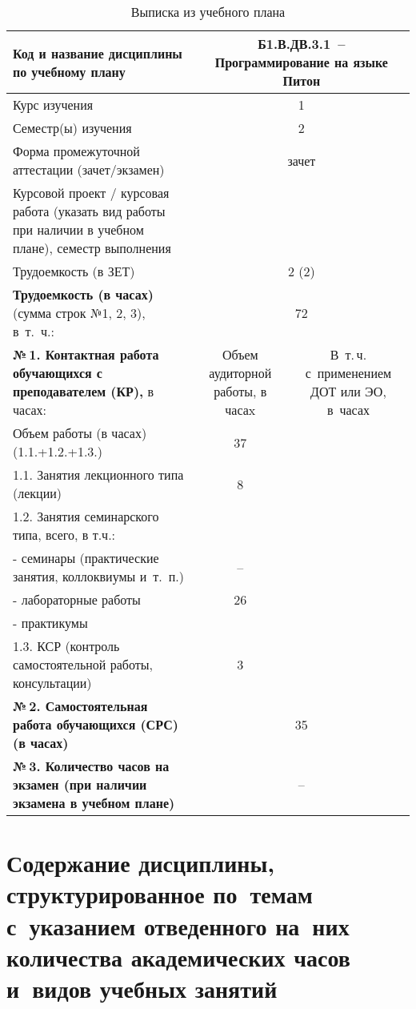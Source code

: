 \documentclass[a4paper,12pt]{article}
\begin{document}
\begin{table}[H]
\caption{Выписка из учебного плана} 
\begin{tabular}{|p{9cm}|c|c|}
\hline
Код и название дисциплины по учебному плану & \multicolumn{2}{p{6cm}|}{Б1.В.ДВ.3.1\ -- Программирование на языке Питон }\\
\hline
Курс изучения &\multicolumn{2}{c|}{ 1 }\\
\hline
Семестр(ы) изучения &\multicolumn{2}{c|}{ 2 }\\
\hline
Форма промежуточной аттестации (зачет/экзамен) &\multicolumn{2}{c|}{ зачет }\\
\hline
Курсовой проект / курсовая работа (указать вид работы при наличии в учебном плане), семестр выполнения &\multicolumn{2}{c|}{ }\\
\hline
Трудоемкость (в ЗЕТ) &\multicolumn{2}{c|}{ 2 (2) }\\
\hline
{\bf Трудоемкость (в часах)} (сумма строк №1, 2, 3), в~т.~ч.:& \multicolumn{2}{c|}{72}\\
\hline
\textbf{№\,1. Контактная работа обучающихся с преподавателем (КР),} в часах:
& \multicolumn{1}{p{3cm}|}{\centering Объем аудиторной работы, в часаx}
& \multicolumn{1}{p{3cm}|}{\centering\arraybackslash В~т.\,ч. с~применением ДОТ или ЭО, в~часах}\\
\hline  
Объем работы (в часах) (1.1.+1.2.+1.3.)& 37 & \\
\hline
1.1. Занятия лекционного типа (лекции) & 8 & \\
\hline
1.2. Занятия семинарского типа, всего, в т.ч.: & & \\
\hline
- семинары (практические занятия, коллоквиумы и~т.~п.)  & – & \\
\hline
- лабораторные работы& 26 & \\
\hline
- практикумы & & \\
\hline
1.3. КСР (контроль самостоятельной работы, консультации)& 3 & \\
\hline
{\bf №\,2. Самостоятельная работа обучающихся (СРС) (в часах)}& \multicolumn{2}{c|}{35}\\
\hline
{\bf №\,3. Количество часов на экзамен (при наличии экзамена в учебном плане)}& \multicolumn{2}{c|}{–}\\
\hline
\end{tabular}
\end{table}



\newpage
\section{Содержание дисциплины, структурированное по~темам с~указанием отведенного на~них количества академических часов и~видов учебных занятий}
\end{document}
